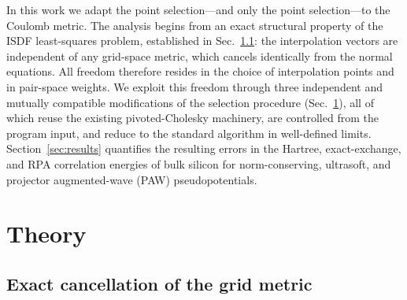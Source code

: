 \documentclass[aps,prb,twocolumn,superscriptaddress,amsmath,amssymb]{revtex4-2}
\begin{document}
In this work we adapt the point selection---and only the point
selection---to the Coulomb metric. The analysis begins from an exact
structural property of the ISDF least-squares problem, established in
Sec.~\ref{sec:cancellation}: the interpolation vectors are independent of
any grid-space metric, which cancels identically from the normal equations.
All freedom therefore resides in the choice of interpolation points and in
pair-space weights. We exploit this freedom through three independent and
mutually compatible modifications of the selection procedure
(Sec.~\ref{sec:theory}), all of which reuse the existing pivoted-Cholesky
machinery, are controlled from the program input, and reduce to the standard
algorithm in well-defined limits. Section~\ref{sec:results} quantifies the
resulting errors in the Hartree, exact-exchange, and RPA correlation
energies of bulk silicon for norm-conserving, ultrasoft, and projector
augmented-wave (PAW) pseudopotentials.

\section{Theory}
\label{sec:theory}

\subsection{Exact cancellation of the grid metric}
\label{sec:cancellation}
\end{document}
